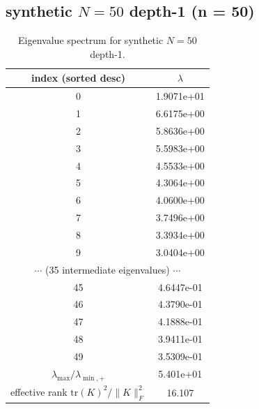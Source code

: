 \subsection*{synthetic $N=50$ depth-1 \quad (n = 50)}
\begin{table}[H]
\centering
\caption{Eigenvalue spectrum for synthetic $N=50$ depth-1.}
\begin{tabular}{c c}
\toprule
index (sorted desc) & $\lambda$ \\
\midrule
0 & 1.9071e+01 \\
1 & 6.6175e+00 \\
2 & 5.8636e+00 \\
3 & 5.5983e+00 \\
4 & 4.5533e+00 \\
5 & 4.3064e+00 \\
6 & 4.0600e+00 \\
7 & 3.7496e+00 \\
8 & 3.3934e+00 \\
9 & 3.0404e+00 \\
\multicolumn{2}{c}{$\cdots$ (35 intermediate eigenvalues) $\cdots$} \\
45 & 4.6447e-01 \\
46 & 4.3790e-01 \\
47 & 4.1888e-01 \\
48 & 3.9411e-01 \\
49 & 3.5309e-01 \\
\midrule
$\lambda_{\max}/\lambda_{\min, +}$ & 5.401e+01 \\
effective rank $\mathrm{tr}(K)^2/\|K\|_F^2$ & 16.107 \\
\bottomrule
\end{tabular}
\end{table}
